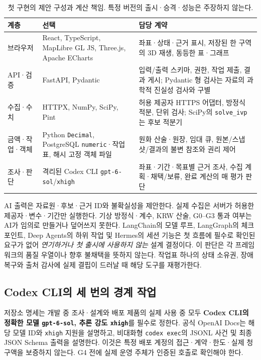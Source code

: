 \documentclass[11pt,a4paper]{article}
\begin{document}
\begin{table}[htbp]
\centering\small
\caption{첫 구현의 제안 구성과 계산 책임. 특정 버전의 출시·승격·성능은 주장하지 않는다.}
\label{tab:stack}
\begin{tabularx}{\textwidth}{p{2.5cm}p{4.1cm}Y}
\toprule
계층 & 선택 & 담당 계약 \\
\midrule
브라우저 & React, TypeScript, MapLibre GL JS, Three.js, Apache ECharts & 좌표·상태·근거 표시, 저장된 한 구역의 3D 재생, 동등한 표·그래프 \\
API·검증 & FastAPI, Pydantic & 입력/출력 스키마, 권한, 작업 제출, 결과 게시; Pydantic 형 검사는 자료의 과학적 진실성 검사와 구별 \\
수집·수치 & HTTPX, NumPy, SciPy, Pint & 허용 제공자 HTTPS 어댑터, 방정식 적분, 단위 검사; SciPy의 \texttt{solve\_ivp}는 후보 적분기\cite{scipy-ivp} \\
금액·작업·객체 & Python \texttt{Decimal}, PostgreSQL \texttt{numeric}·작업표, 해시 고정 객체 파일 & 원화 산술·원장, 임대 큐, 원본/스냅샷/결과의 불변 참조와 권리 제어 \\
조사·판단 & 격리된 Codex CLI \texttt{gpt-6-sol}/\texttt{xhigh} & 좌표·기간·목표별 근거 조사, 수집 계획·채택/보류, 완료 계산의 매 평가 판단 \\
\bottomrule
\end{tabularx}
\end{table}

AI 출력은 자료원·후보·근거 ID와 불확실성을 제안한다. 실제 수집은 서버가 허용한 제공자·변수·기간만 실행한다. 기상 방정식·계수, KRW 산술, G0--G3 통과 여부는 AI가 임의로 만들거나 덮어쓰지 못한다. LangChain의 모델 루프, LangGraph의 체크포인트, Deep Agents의 하위 작업 및 Hermes의 세션 기능은 첫 흐름에 필수로 확인된 요구가 없어 \emph{연기하거나 첫 출시에 사용하지 않는} 설계 결정이다. 이 판단은 각 프레임워크의 품질 우열이나 향후 불채택을 뜻하지 않는다. 작업표 하나의 상태 소유권, 장애 복구와 출처 감사에 실제 결핍이 드러날 때 해당 도구를 재평가한다.

\subsection{Codex CLI의 세 번의 경계 작업}
저장소 명세는 개발 중 조사·설계와 배포 제품의 실제 사용 중 모두 \textbf{Codex CLI의 정확한 모델 \texttt{gpt-6-sol}, 추론 강도 \texttt{xhigh}}를 필수로 정한다. 공식 OpenAI Docs는 해당 모델 ID와 \texttt{xhigh} 지원을 설명하고, 비대화형 \texttt{codex exec}의 JSONL 사건 및 최종 JSON Schema 출력을 설명한다\cite{openai-model,openai-exec}. 이것은 특정 배포 계정의 접근·계약·한도·실제 청구액을 보증하지 않는다. G4 전에 실제 운영 주체가 인증된 호출로 확인해야 한다.
\end{document}
